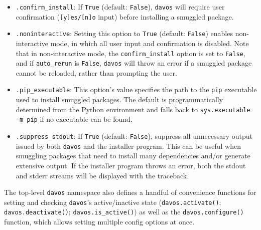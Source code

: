 \documentclass[preprint,12pt,a4paper]{elsarticle}
\begin{document}
\begin{itemize}
\item \texttt{.confirm\_install}: If \texttt{True} (default: \texttt{False}), \texttt{davos} will require user confirmation (\texttt{[y]es/[n]o} input) before installing a smuggled package.
\item \texttt{.noninteractive}: Setting this option to \texttt{True} (default: \texttt{False}) enables non-interactive mode, in which all user input and confirmation is disabled. Note that in non-interactive mode, the \texttt{confirm\_install} option is set to \texttt{False}, and if \texttt{auto\_rerun} is \texttt{False}, \texttt{davos} will throw an error if a smuggled package cannot be reloaded, rather than prompting the user.
\item \texttt{.pip\_executable}: This option's value specifies the path to the \texttt{pip} executable used to install smuggled packages. The default is programmatically determined from the Python environment and falls back to \texttt{sys.executable -m pip} if no executable can be found.
\item \texttt{.suppress\_stdout}: If \texttt{True} (default: \texttt{False}), suppress all unnecessary output issued by both \texttt{davos} and the installer program. This can be useful when smuggling packages that need to install many dependencies and/or generate extensive output. If the installer program throws an error, both the stdout and stderr streams will be displayed with the traceback.
\end{itemize}

\noindent The top-level \texttt{davos} namespace also defines a handful of convenience functions for setting and checking \texttt{davos}'s active/inactive state (\texttt{davos.activate()}; \texttt{davos.deactivate()}; \texttt{davos.is\_active()}) as well as the \texttt{davos.configure()} function, which allows setting multiple config options at once.
\end{document}
